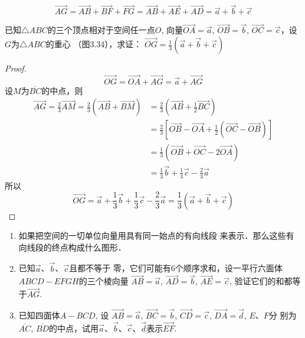 \begin{solution}
\[\Vec{AG}=\Vec{AB}+\Vec{BF}+\Vec{FG}=\Vec{AB}+\Vec{AE}+\Vec{AD}=\vec{a}+\vec{b}+\vec{c}\]
\end{solution}

\begin{example}
    已知$\triangle ABC$的三个顶点相对于空间任一点$O$, 
 向量$\Vec{OA}=\vec{a}$, $\Vec{OB}=\vec{b}$, $\Vec{OC}=\vec{c}$，设$G$为$\triangle ABC$的重心
    （图3.34），求证：
$\Vec{OG}=\frac{1}{3}\left(\vec{a}+\vec{b}+\vec{c}\right)$
\end{example}

\begin{figure}[htp]
    \centering
{}
    \caption{}
\end{figure}


\begin{proof}
\[\Vec{OG}=\Vec{OA}+\Vec{AG}=\vec{a}+\Vec{AG}\]
设$M$为$\overline{BC}$的中点，则
\[\begin{split}
\Vec{AG}=\frac{2}{3}\Vec{AM}=\frac{2}{3}\left(\Vec{AB}+\Vec{BM}\right)&=\frac{2}{3}\left(\Vec{AB}+\frac{1}{2}\Vec{BC}\right)\\
&=\frac{2}{3}\left[\Vec{OB}-\Vec{OA}+\frac{1}{2}\left(\Vec{OC}-\Vec{OB}\right)\right]\\
&=\frac{1}{3}\left(\Vec{OB}+\Vec{OC}-2\Vec{OA}\right)\\
&=\frac{1}{3}\vec{b}+\frac{1}{3}\vec{c}-\frac{2}{3}\vec{a}
\end{split}\]
所以
\[\Vec{OG}=\vec{a}+\frac{1}{3}\vec{b}+\frac{1}{3}\vec{c}-\frac{2}{3}\vec{a}=\frac{1}{3}\left(\vec{a}+\vec{b}+\vec{c}\right)\]
\end{proof}

\begin{ex}
    \begin{enumerate}
        \item 如果把空间的一切单位向量用具有同一始点的有向线段
        来表示．那么这些有向线段的终点构成什么图形．
\item 已知$\vec{a}$、$\vec{b}$、$\vec{c}$且都不等于
零，它们可能有6个顺序求和，设一平行六面体$ABCD
-EFGH$的三个棱向量
$\Vec{AB}=\vec{a}$, $\Vec{AD}=\vec{b}$, $\Vec{AE}=\vec{c}$, 验证它们的和都等于$\Vec{AG}$.
\item 已知四面体$A-BCD$, 设
$\Vec{AB}=\vec{a}$, $\Vec{BC}=\vec{b}$, $\Vec{CD}=\vec{c}$, $\Vec{DA}=\vec{d}$, $E$、$F$分
别为$\overline{AC}$, $\overline{BD}$的中点，试用$\vec{a}$、$\vec{b}$、$\vec{c}$、$\vec{d}$表示$\Vec{EF}$.
    \end{enumerate}
\end{ex}

